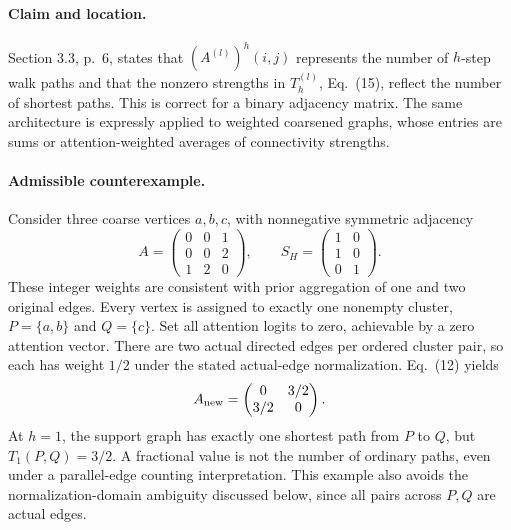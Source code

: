 \documentclass[10pt]{article}
\begin{document}
\paragraph*{Claim and location.}\mbox{}\par
Section 3.3, p. 6, states that \((A^{(l)})^h(i,j)\) represents the number of \(h\)-step walk paths and that the nonzero strengths in \(T_h^{(l)}\), Eq. (15), reflect the number of shortest paths. This is correct for a binary adjacency matrix. The same architecture is expressly applied to weighted coarsened graphs, whose entries are sums or attention-weighted averages of connectivity strengths.\par
\paragraph*{Admissible counterexample.}\mbox{}\par
Consider three coarse vertices \(a,b,c\), with nonnegative symmetric adjacency \[A=\begin{pmatrix}0&0&1\\0&0&2\\1&2&0\end{pmatrix},
\qquad
S_H=\begin{pmatrix}1&0\\1&0\\0&1\end{pmatrix}.\] These integer weights are consistent with prior aggregation of one and two original edges. Every vertex is assigned to exactly one nonempty cluster, \(P=\{a,b\}\) and \(Q=\{c\}\). Set all attention logits to zero, achievable by a zero attention vector. There are two actual directed edges per ordered cluster pair, so each has weight \(1/2\) under the stated actual-edge normalization. Eq. (12) yields \[A_{\rm new}=\begin{pmatrix}0&3/2\\3/2&0\end{pmatrix}.\] At \(h=1\), the support graph has exactly one shortest path from \(P\) to \(Q\), but \(T_1(P,Q)=3/2\). A fractional value is not the number of ordinary paths, even under a parallel-edge counting interpretation. This example also avoids the normalization-domain ambiguity discussed below, since all pairs across \(P,Q\) are actual edges.\par
\end{document}
